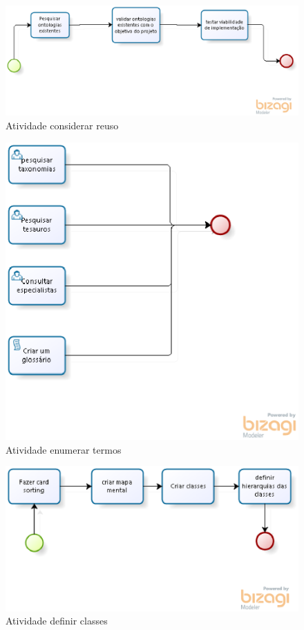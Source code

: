  \begin{figure}[H]
  \centering
    \includegraphics[keepaspectratio=true,scale=0.5]{figuras/Considerar_reuso.eps}
  \caption{Atividade considerar reuso}
\end{figure}

\begin{figure}[H]
  \centering
    \includegraphics[keepaspectratio=true,scale=0.5]{figuras/Enumerar_termos.eps}
  \caption{Atividade enumerar termos}
\end{figure}

 \begin{figure}[H]
  \centering
    \includegraphics[keepaspectratio=true,scale=0.5]{figuras/Definir_classes.eps}
  \caption{Atividade definir classes}
\end{figure}

